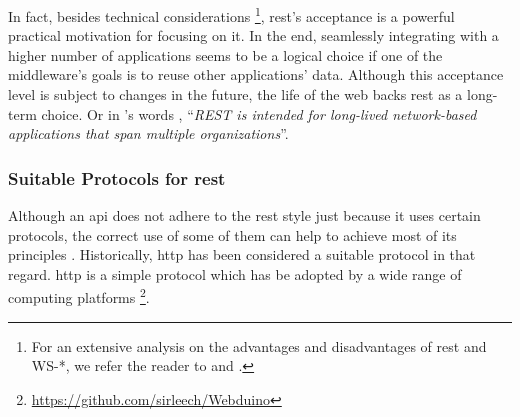 In fact, besides technical considerations
\footnote{For an extensive analysis on the advantages and disadvantages of \ac{rest} and WS-*, we refer the reader to \citep{pautasso_restful_2008} and \citep{guinard_search_2011}.},
\ac{rest}'s acceptance is a powerful practical motivation for focusing on it.
In the end, seamlessly integrating with a higher number of applications seems to be a logical choice if one of the middleware's goals is to reuse other applications' data. %
Although this acceptance level is subject to changes in the future, the life of the web backs \ac{rest} as a long-term choice.
Or in \citeauthor{fielding_architectural_2000}'s words \cite[comment 21]{fielding_rest_2008},
``\emph{REST is intended for long-lived network-based applications that span multiple organizations}''.



\subsubsection{Suitable Protocols for \ac{rest}}
\label{sec:protocols}

Although an \ac{api} does not adhere to the \ac{rest} style just because it uses certain protocols,
the correct use of some of them can help to achieve most of its principles \citep{moore_hypermedia_2010}.
Historically, \ac{http} has been considered a suitable protocol in that regard.
\ac{http} is a simple protocol which has be adopted by a wide range of computing platforms \citep{yazar_efficient_2009,hammel_mongoose:_2010}\footnote{\url{https://github.com/sirleech/Webduino}}. %


